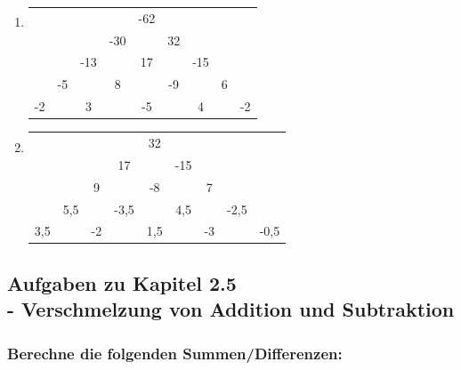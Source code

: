 \documentclass[a4paper,12pt]{article} %
\begin{document}
\begin{enumerate}[label=\alph*)]

  \item %
  \vspace{1cm}
  \begin{center}
    \begin{tabular}{c c c c c c c c c}
      & & & & -62 & & & & \\
      & & & -30 & & 32 & & & \\
      & & -13 & & 17 & & -15 & & \\
      & -5 & & 8 & & -9 & & 6 & \\
      -2 & & 3 & & -5 & & 4 & & -2 \\
    \end{tabular}
  \end{center}

  \item %
  \vspace{1cm}
  \begin{center}
    \begin{tabular}{c c c c c c c c c}
      & & & & 32 & & & & \\
      & & & 17 & & -15 & & & \\
      & & 9 & & -8 & & 7 & \\
      & 5,5 & & -3,5 & & 4,5 & & -2,5 & \\
      3,5 & & -2 & & 1,5 & & -3 & & -0,5 \\
    \end{tabular}
  \end{center}

\end{enumerate}
\vspace{1cm}

\subsection{Aufgaben zu Kapitel 2.5 \\
  - Verschmelzung von Addition und Subtraktion}

\subsubsection{Berechne die folgenden Summen/Differenzen:} %
\end{document}
